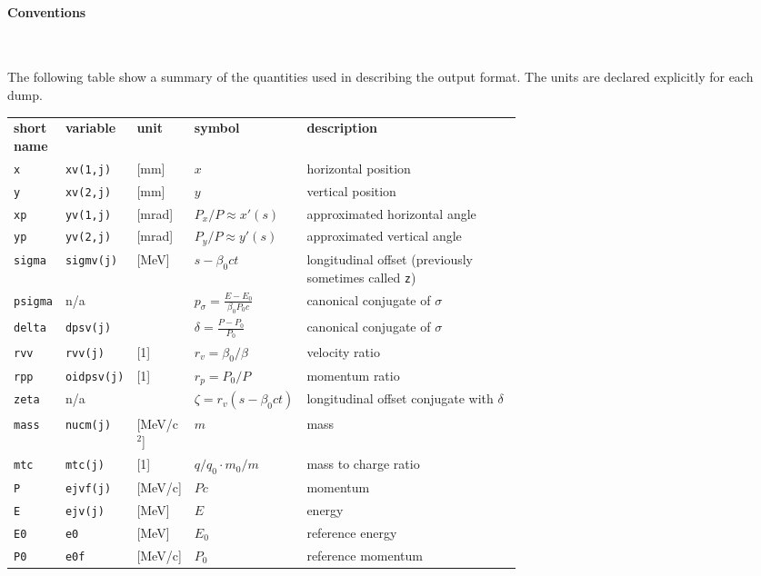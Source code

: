 \paragraph{Conventions}~

The following table show a summary of the quantities used in describing the output format. The units are declared explicitly for each dump. 

\bigskip
\begin{longtabu}{@{}llllp{0.65\linewidth}}
    \textbf{short name} & \textbf{variable} & \textbf{unit} &
    \textbf{symbol} & \textbf{description} \\
    \texttt{x} & \texttt{xv(1,j)} &[mm] & $x$& horizontal position\\
    \texttt{y} & \texttt{xv(2,j)} &[mm] & $y$& vertical position\\
    \texttt{xp} & \texttt{yv(1,j)} &[mrad] & $P_x/P\approx x'(s)$&  approximated horizontal angle\\
    \texttt{yp} & \texttt{yv(2,j)} &[mrad]& $P_y/P\approx y'(s)$&  approximated vertical angle\\
    \texttt{sigma} & \texttt{sigmv(j)} &[MeV] & $s-\beta_0 c t $& longitudinal offset (previously sometimes called \texttt{z})\\
    \texttt{psigma} & n/a &  & $ p_\sigma=\frac{E-E_0}{\beta_0 P_0 c}$& canonical conjugate of $\sigma$ \\
    \texttt{delta} & \texttt{dpsv(j)} &  & $ \delta=\frac{P-P_0}{P_0}$& canonical conjugate of $\sigma$ \\
    \texttt{rvv}   & \texttt{rvv(j)} & [1]& $r_v=\beta_0/\beta$ &velocity ratio \\
    \texttt{rpp}   & \texttt{oidpsv(j)} & [1]& $r_p=P_0/P$ &momentum ratio \\
    \texttt{zeta} &  n/a & & $\zeta=r_v(s-\beta_0 c t) $& longitudinal offset conjugate with $\delta$\\
    \texttt{mass}  & \texttt{nucm(j)} & [MeV/c$^2$] & $m$ &mass \\
    \texttt{mtc}  & \texttt{mtc(j)} & [1] & $q/q_0 \cdot m_0/m $ & mass to charge ratio\\
    \texttt{P} & \texttt{ejvf(j)} &[MeV/c] & $Pc$& momentum \\
    \texttt{E} & \texttt{ejv(j)} &[MeV] & $E$& energy \\
    \texttt{E0} & \texttt{e0} &[MeV] & $E_0$& reference energy \\
    \texttt{P0} & \texttt{e0f} &[MeV/c] & $P_0$& reference momentum \\
\end{longtabu}


